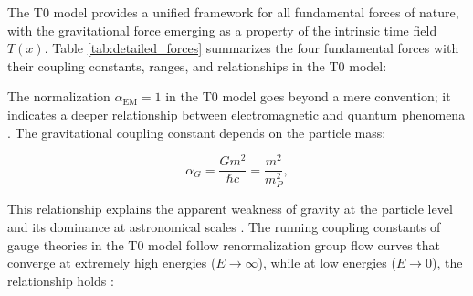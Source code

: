 \documentclass[twocolumn,aps,prl]{revtex4-2}
\begin{document}
	The T0 model provides a unified framework for all fundamental forces of nature, with the gravitational force emerging as a property of the intrinsic time field $T(x)$. Table \ref{tab:detailed_forces} summarizes the four fundamental forces with their coupling constants, ranges, and relationships in the T0 model:
	
	\begin{table}[H]
		\centering
		\caption{Fundamental forces in the T0 model with their coupling constants}
		\label{tab:detailed_forces}
		\small
		\setlength{\tabcolsep}{4pt}
	\end{table}
	
	The normalization $\alpha_{\text{EM}} = 1$ in the T0 model goes beyond a mere convention; it indicates a deeper relationship between electromagnetic and quantum phenomena \cite{Sommerfeld1916, Aoyama2018}. The gravitational coupling constant depends on the particle mass:
	
	\begin{equation}
		\alpha_G = \frac{G m^2}{\hbar c} = \frac{m^2}{m_P^2}, \label{eq:alpha_G}
	\end{equation}
	
	This relationship explains the apparent weakness of gravity at the particle level and its dominance at astronomical scales \cite{pascher_emergente_2025}. The running coupling constants of gauge theories in the T0 model follow renormalization group flow curves that converge at extremely high energies ($E \to \infty$), while at low energies ($E \to 0$), the relationship holds \cite{Weinberg1989}:
	
\end{document}
